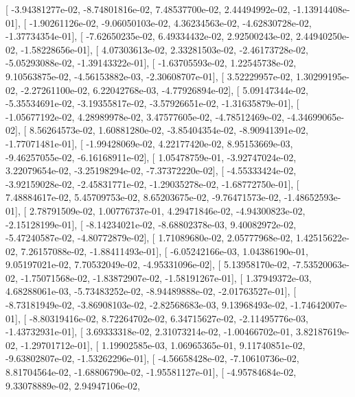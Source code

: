 \documentclass{article}
\begin{document}
       [ -3.94381277e-02,  -8.74801816e-02,   7.48537700e-02,
          2.44494992e-02,  -1.13914408e-01],
       [ -1.90261126e-02,  -9.06050103e-02,   4.36234563e-02,
         -4.62830728e-02,  -1.37734354e-01],
       [ -7.62650235e-02,   6.49334432e-02,   2.92500243e-02,
          2.44940250e-02,  -1.58228656e-01],
       [  4.07303613e-02,   2.33281503e-02,  -2.46173728e-02,
         -5.05293088e-02,  -1.39143322e-01],
       [ -1.63705593e-02,   1.22545738e-02,   9.10563875e-02,
         -4.56153882e-03,  -2.30608707e-01],
       [  3.52229957e-02,   1.30299195e-02,  -2.27261100e-02,
          6.22042768e-03,  -4.77926894e-02],
       [  5.09147344e-02,  -5.35534691e-02,  -3.19355817e-02,
         -3.57926651e-02,  -1.31635879e-01],
       [ -1.05677192e-02,   4.28989978e-02,   3.47577605e-02,
         -4.78512469e-02,  -4.34699065e-02],
       [  8.56264573e-02,   1.60881280e-02,  -3.85404354e-02,
         -8.90941391e-02,  -1.77071481e-01],
       [ -1.99428069e-02,   4.22177420e-02,   8.95153669e-03,
         -9.46257055e-02,  -6.16168911e-02],
       [  1.05478759e-01,  -3.92747024e-02,   3.22079654e-02,
         -3.25198294e-02,  -7.37372220e-02],
       [ -4.55333424e-02,  -3.92159028e-02,  -2.45831771e-02,
         -1.29035278e-02,  -1.68772750e-01],
       [  7.48884617e-02,   5.45709753e-02,   8.65203675e-02,
         -9.76471573e-02,  -1.48652593e-01],
       [  2.78791509e-02,   1.00776737e-01,   4.29471846e-02,
         -4.94300823e-02,  -2.15128199e-01],
       [ -8.14234021e-02,  -8.68802378e-03,   9.40082972e-02,
         -5.47240587e-02,  -4.80772879e-02],
       [  1.71089680e-02,   2.05777968e-02,   1.42515622e-02,
          7.26157088e-02,  -1.88411493e-01],
       [ -6.05242166e-03,   1.04386190e-01,   9.05197021e-02,
          7.70532049e-02,  -4.95331096e-02],
       [  5.13958170e-02,  -7.53520063e-02,  -1.75071568e-02,
         -1.83872907e-02,  -1.58191267e-01],
       [  1.37949372e-03,   4.68288061e-03,  -5.73483252e-02,
         -8.94489888e-02,  -2.01763527e-01],
       [ -8.73181949e-02,  -3.86908103e-02,  -2.82568683e-03,
          9.13968493e-02,  -1.74642007e-01],
       [ -8.80319416e-02,   8.72264702e-02,   6.34715627e-02,
         -2.11495776e-03,  -1.43732931e-01],
       [  3.69333318e-02,   2.31073214e-02,  -1.00466702e-01,
          3.82187619e-02,  -1.29701712e-01],
       [  1.19902585e-03,   1.06965365e-01,   9.11740851e-02,
         -9.63802807e-02,  -1.53262296e-01],
       [ -4.56658428e-02,  -7.10610736e-02,   8.81704564e-02,
         -1.68806790e-02,  -1.95581127e-01],
       [ -4.95784684e-02,   9.33078889e-02,   2.94947106e-02,
\end{document}
